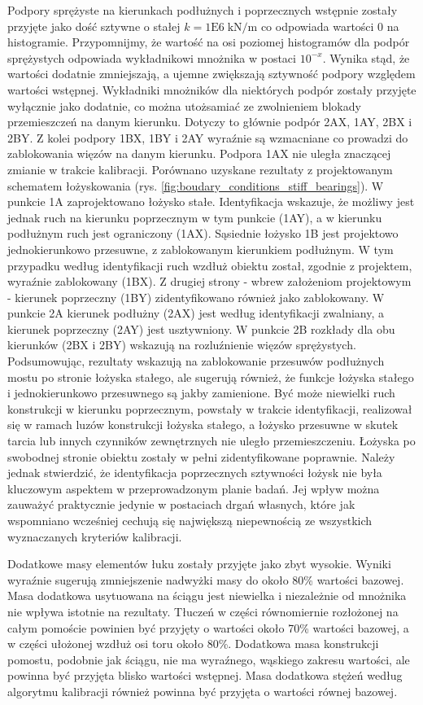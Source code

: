 Podpory sprężyste na kierunkach podłużnych i poprzecznych wstępnie zostały przyjęte jako dość sztywne o stałej $k=1\mathrm{E}6\;\mathrm{kN/m}$ co odpowiada wartości 0 na histogramie. Przypomnijmy, że wartość na osi poziomej histogramów dla podpór sprężystych odpowiada wykładnikowi mnożnika w postaci $10^{-x}$. Wynika stąd, że wartości dodatnie zmniejszają, a ujemne zwiększają sztywność podpory względem wartości wstępnej. Wykładniki mnożników dla niektórych podpór zostały przyjęte wyłącznie jako dodatnie, co można utożsamiać ze zwolnieniem blokady przemieszczeń na danym kierunku. Dotyczy to głównie podpór 2AX, 1AY, 2BX i 2BY. Z kolei podpory 1BX, 1BY i 2AY wyraźnie są wzmacniane co prowadzi do zablokowania więzów na danym kierunku. Podpora 1AX nie uległa znaczącej zmianie w trakcie kalibracji. Porównano uzyskane rezultaty z projektowanym schematem łożyskowania (rys. \ref{fig:boudary_conditions_stiff_bearings}). W punkcie 1A zaprojektowano łożysko stałe. Identyfikacja wskazuje, że możliwy jest jednak ruch na kierunku poprzecznym w tym punkcie (1AY), a w kierunku podłużnym ruch jest ograniczony (1AX). Sąsiednie łożysko 1B jest projektowo jednokierunkowo przesuwne, z zablokowanym kierunkiem podłużnym. W tym przypadku według identyfikacji ruch wzdłuż obiektu został, zgodnie z projektem, wyraźnie zablokowany (1BX). Z drugiej strony - wbrew założeniom projektowym - kierunek poprzeczny (1BY) zidentyfikowano również jako zablokowany. W punkcie 2A kierunek podłużny (2AX) jest według identyfikacji zwalniany, a kierunek poprzeczny (2AY) jest usztywniony. W punkcie 2B rozkłady dla obu kierunków (2BX i 2BY) wskazują na rozluźnienie więzów sprężystych. Podsumowując, rezultaty wskazują na zablokowanie przesuwów podłużnych mostu po stronie łożyska stałego, ale sugerują również, że funkcje łożyska stałego i jednokierunkowo przesuwnego są jakby zamienione. Być może niewielki ruch konstrukcji w kierunku poprzecznym, powstały w trakcie identyfikacji, realizował się w ramach luzów konstrukcji łożyska stałego, a łożysko przesuwne w skutek tarcia lub innych czynników zewnętrznych nie uległo przemieszczeniu. Łożyska po swobodnej stronie obiektu zostały w pełni zidentyfikowane poprawnie. Należy jednak stwierdzić, że identyfikacja poprzecznych sztywności łożysk nie była kluczowym aspektem w przeprowadzonym planie badań. Jej wpływ można zauważyć praktycznie jedynie w postaciach drgań własnych, które jak wspomniano wcześniej cechują się największą niepewnością ze wszystkich wyznaczanych kryteriów kalibracji. 

Dodatkowe masy elementów łuku zostały przyjęte jako zbyt wysokie. Wyniki wyraźnie sugerują zmniejszenie nadwyżki masy do około 80\% wartości bazowej. Masa dodatkowa usytuowana na ściągu jest niewielka i niezależnie od mnożnika nie wpływa istotnie na rezultaty. Tłuczeń w części równomiernie rozłożonej na całym pomoście powinien być przyjęty o wartości około 70\% wartości bazowej, a w części ułożonej wzdłuż osi toru około 80\%. Dodatkowa masa konstrukcji pomostu, podobnie jak ściągu, nie ma wyraźnego, wąskiego zakresu wartości, ale powinna być przyjęta blisko wartości wstępnej. Masa dodatkowa stężeń według algorytmu kalibracji również powinna być przyjęta o wartości równej bazowej. 

